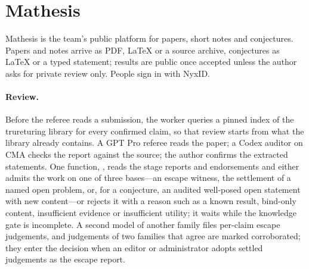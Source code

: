 \documentclass[11pt]{article}
\newcommand{\code}[1]{\texttt{\detokenize{#1}}}
\begin{document}
\section{Mathesis}
\label{sec:mathesis}
Mathesis \citep{mathesisrepo} is the team's public platform for papers,
short notes and conjectures. Papers and notes arrive as PDF, \LaTeX{} or a
source archive, conjectures as \LaTeX{} or a typed statement; results are
public once accepted unless the author asks for private review only. People
sign in with NyxID.

\paragraph{Review.} Before the referee reads a submission, the worker queries
a pinned index of the trureturing library for every confirmed claim, so that
review starts from what the library already contains. A GPT Pro referee
reads the paper; a Codex auditor on CMA checks the report against the source;
the author confirms the extracted statements. One function,
\code{Policy::decide}, reads the stage reports and endorsements and either
admits the work on one of three bases---an escape witness, the settlement of
a named open problem, or, for a conjecture, an audited well-posed open
statement with new content---or rejects it with a reason such as a known
result, bind-only content, insufficient evidence or insufficient utility; it
waits while the knowledge gate is incomplete. A second model of another
family files per-claim escape judgements, and judgements of two families
that agree are marked corroborated; they enter the decision when an editor
or administrator adopts settled judgements as the escape report.
\end{document}

